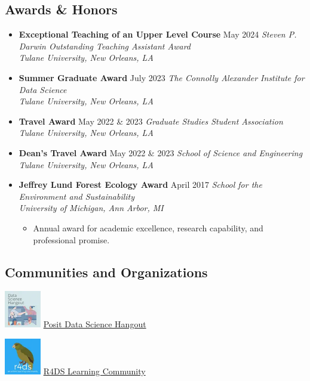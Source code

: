 \documentclass[
  letterpaper,
  DIV=11,
  numbers=noendperiod]{scrartcl}
\providecommand{\tightlist}{%
  \setlength{\itemsep}{0pt}\setlength{\parskip}{0pt}}\usepackage{longtable,booktabs,array}
\begin{document}
\subsection{\texorpdfstring{ Awards \&
Honors}{ Awards \& Honors}}\label{awards-honors}

\begin{itemize}
\item
  \textbf{Exceptional Teaching of an Upper Level Course} {May 2024}
  \emph{Steven P. Darwin Outstanding Teaching Assistant Award}\\
  \emph{Tulane University, New Orleans, LA}
\item
  \textbf{Summer Graduate Award} {July 2023} \emph{The Connolly
  Alexander Institute for Data Science}\\
  \emph{Tulane University, New Orleans, LA}
\item
  \textbf{Travel Award} {May 2022 \& 2023} \emph{Graduate Studies
  Student Association}\\
  \emph{Tulane University, New Orleans, LA}
\item
  \textbf{Dean's Travel Award} {May 2022 \& 2023} \emph{School of
  Science and Engineering}\\
  \emph{Tulane University, New Orleans, LA}
\item
  \textbf{Jeffrey Lund Forest Ecology Award} {April 2017} \emph{School
  for the Environment and Sustainability}\\
  \emph{University of Michigan, Ann Arbor, MI}

  \begin{itemize}
  \tightlist
  \item
    Annual award for academic excellence, research capability, and
    professional promise.
  \end{itemize}
\end{itemize}

\subsection{\texorpdfstring{ Communities and
Organizations}{ Communities and Organizations}}\label{communities-and-organizations}

\includegraphics[width=0.625in,height=\textheight]{../assets/img/dsh.webp}
\href{https://posit.co/data-science-hangout/}{Posit Data Science
Hangout}

\includegraphics[width=0.625in,height=\textheight]{../assets/img/r4ds.webp}
\href{https://rfordatasci.com/}{R4DS Learning Community}
\end{document}
